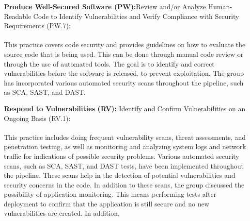 \textbf{Produce Well-Secured Software (PW):}Review and/or Analyze Human-Readable
Code to Identify Vulnerabilities and Verify Compliance with Security Requirements (PW.7): \cite{ssdf}
\\~\\
This practice covers code security and provides guidelines on how to evaluate the source code that is being used. This can be done through manual code review or through the use of automated tools.  The goal is to identify and correct vulnerabilities before the software is released, to prevent exploitation. The group has incorporated various automated security scans throughout the pipeline, such as SCA, SAST, and DAST. 


\textbf{Respond to Vulnerabilities (RV):}
Identify and Confirm Vulnerabilities on an Ongoing Basis (RV.1): \cite{ssdf}
\\~\\This practice includes doing frequent vulnerability scans, threat assessments, and penetration testing, as well as monitoring and analyzing system logs and network traffic for indications of possible security problems. Various automated security scans, such as SCA, SAST, and DAST tests, have been implemented throughout the pipeline. These scans help in the detection of potential vulnerabilities and security concerns in the code. In addition to these scans, the group discussed the possibility of application monitoring. This means performing tests after deployment to confirm that the application is still secure and no new vulnerabilities are created. In addition, 

